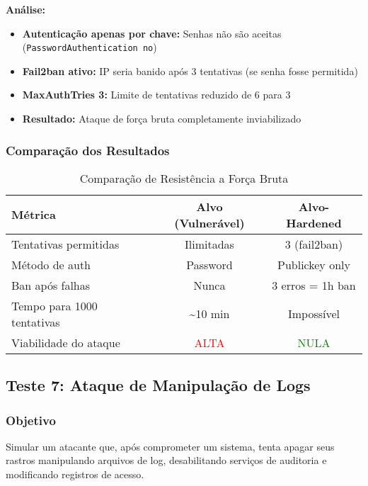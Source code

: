 \documentclass[12pt]{article}
\begin{document}
\textbf{Análise:}
\begin{itemize}
    \item \textbf{Autenticação apenas por chave:} Senhas não são aceitas (\texttt{PasswordAuthentication no})
    \item \textbf{Fail2ban ativo:} IP seria banido após 3 tentativas (se senha fosse permitida)
    \item \textbf{MaxAuthTries 3:} Limite de tentativas reduzido de 6 para 3
    \item \textbf{Resultado:} Ataque de força bruta completamente inviabilizado
\end{itemize}

\subsubsection{Comparação dos Resultados}

\begin{table}[h]
\centering
\begin{tabular}{|l|c|c|}
\hline
\textbf{Métrica} & \textbf{Alvo (Vulnerável)} & \textbf{Alvo-Hardened} \\ \hline
Tentativas permitidas & Ilimitadas & 3 (fail2ban) \\ \hline
Método de auth & Password & Publickey only \\ \hline
Ban após falhas & Nunca & 3 erros = 1h ban \\ \hline
Tempo para 1000 tentativas & \textasciitilde10 min & Impossível \\ \hline
Viabilidade do ataque & \textcolor{red}{ALTA} & \textcolor{green}{NULA} \\ \hline
\end{tabular}
\caption{Comparação de Resistência a Força Bruta}
\end{table}

\subsection{Teste 7: Ataque de Manipulação de Logs}

\subsubsection{Objetivo}
Simular um atacante que, após comprometer um sistema, tenta apagar seus rastros manipulando arquivos de log, desabilitando serviços de auditoria e modificando registros de acesso.
\end{document}

